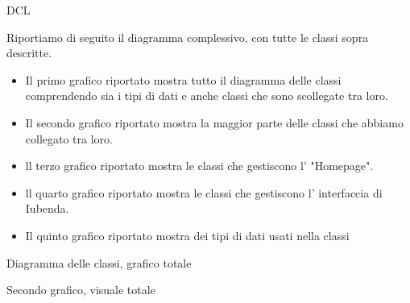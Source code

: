 \begin{listaPersonale}{DCL}
    \begin{center}
        
    \end{center}
    \newpage
        Riportiamo di seguito il diagramma complessivo, con tutte le classi sopra descritte.\\
        \begin{itemize}
            \item Il primo grafico riportato mostra tutto il diagramma delle classi comprendendo sia i tipi di dati e anche classi che sono scollegate tra loro.\\
            \item Il secondo grafico riportato mostra la maggior parte delle classi che abbiamo collegato tra loro.\\
            \item ll terzo grafico riportato mostra le classi che gestiscono l' "Homepage".\\
            \item ll quarto grafico riportato mostra le classi che gestiscono l' interfaccia di Iubenda.\\
            \item Il quinto grafico riportato mostra dei tipi di dati usati nella classi
        \end{itemize}
        \begin{center}
            
            Diagramma delle classi, grafico totale
        \end{center}
        \newpage
        \begin{center}
            
            Secondo grafico, visuale totale

\end{center}
\end{listaPersonale}
